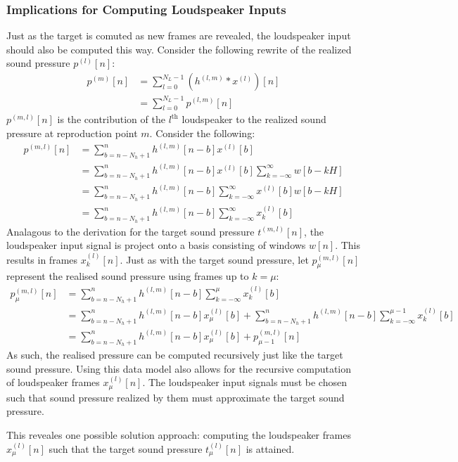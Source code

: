 \subsubsection{Implications for Computing Loudspeaker Inputs}
Just as the target is comuted as new frames are revealed, the loudspeaker input should also be computed this way.
Consider the following rewrite of the realized sound pressure $p^{(l)}[n]$:
\begin{align}
    p^{(m)}[n] &= \sum_{l=0}^{N_L - 1} \left(h^{(l,m)} \ast x^{(l)}\right)[n] \\
               &= \sum_{l=0}^{N_L - 1} p^{(l,m)}[n]
\end{align}
$p^{(m,l)}[n]$ is the contribution of the $l^\text{th}$ loudspeaker to the realized sound pressure at reproduction point $m$.
Consider the following:
\begin{align}
    p^{(m,l)}[n]   &= \sum_{b = n - N_h + 1}^{n} h^{(l,m)}[n - b] x^{(l)}[b] \\
                    &= \sum_{b = n - N_h + 1}^{n} h^{(l,m)}[n - b] x^{(l)}[b] 
                        \sum_{k=-\infty}^{\infty} w[b - kH] \\
                    &= \sum_{b = n - N_h + 1}^{n} h^{(l,m)}[n - b]  
                        \sum_{k=-\infty}^{\infty} x^{(l)}[b] w[b - kH] \\
                    &= \sum_{b = n - N_h + 1}^{n} h^{(l,m)}[n - b]  
                        \sum_{k=-\infty}^{\infty} x_k^{(l)}[b]  
\end{align}
Analagous to the derivation for the target sound pressure $t^{(m,l)}[n]$, the loudspeaker input signal is project onto a basis consisting of windows $w[n]$.
This results in frames $x_k^{(l)}[n]$. 
Just as with the target sound pressure, let $p_\mu^{(m,l)}[n]$ represent the realised sound pressure using frames up to $k = \mu$: 
\begin{align}
    p_\mu^{(m,l)}[n] &= \sum_{b = n - N_h + 1}^{n} h^{(l,m)}[n - b] 
                        \sum_{k=-\infty}^{\mu} x_k^{(l)}[b] \\
                     &= \sum_{b = n - N_h + 1}^{n} h^{(l,m)}[n - b] 
                        x_\mu^{(l)}[b] + \sum_{b = n - N_h + 1}^{n} h^{(l,m)}[n - b] 
                        \sum_{k=-\infty}^{\mu - 1} x_k^{(l)}[b] \\
                     &= \sum_{b = n - N_h + 1}^{n} h^{(l,m)}[n - b] 
                        x_\mu^{(l)}[b] + p_{\mu - 1}^{(m,l)}[n]
\end{align}
As such, the realised pressure can be computed recursively just like the target sound pressure.
Using this data model also allows for the recursive computation of loudspeaker frames $x_\mu^{(l)}[n]$.
The loudspeaker input signals must be chosen such that sound pressure realized by them must approximate the target sound pressure.

This reveales one possible solution approach: computing the loudspeaker frames $x_\mu^{(l)}[n]$ such that the target sound pressure $t_\mu^{(l)}[n]$ is attained.


